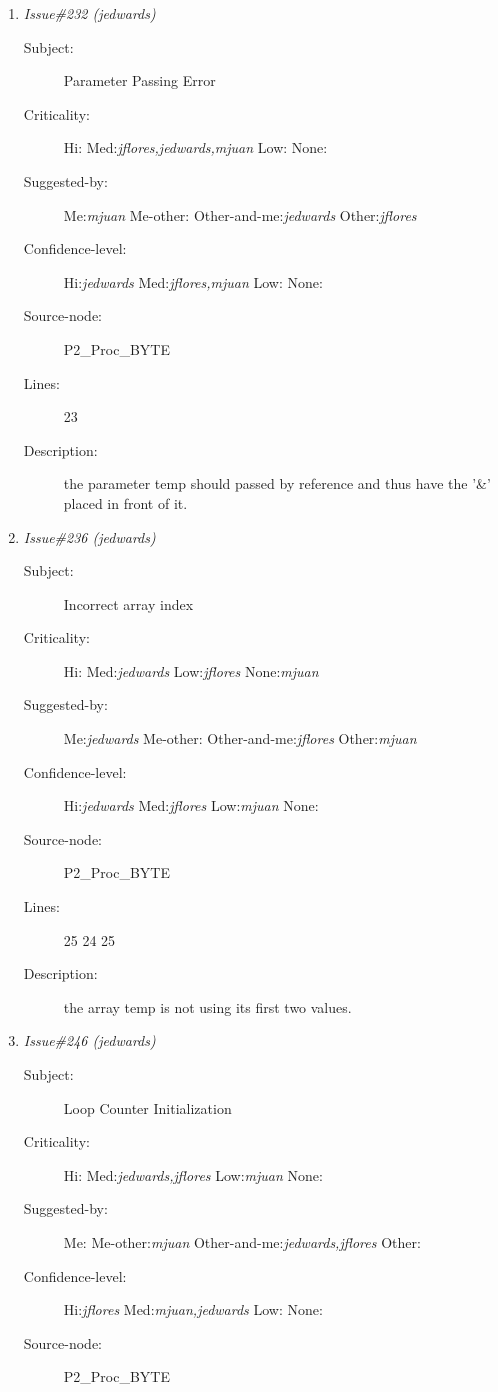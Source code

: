\begin{enumerate}
\begin{description}
\item [Lines:] 18

\item [Description:] Another incorrect loop and variable size
\end{description}
\item {\it Issue\#232 (jedwards)}
\begin{description}
\item [Subject:] Parameter Passing Error
\item [Criticality:] Hi:{\it } Med:{\it jflores,jedwards,mjuan} Low:{\it } None:{\it }
\item [Suggested-by:] Me:{\it mjuan} Me-other:{\it } Other-and-me:{\it jedwards} Other:{\it jflores}
\item [Confidence-level:] Hi:{\it jedwards} Med:{\it jflores,mjuan} Low:{\it } None:{\it }
\item [Source-node:] P2\_Proc\_BYTE

\item [Lines:] 23

\item [Description:] the parameter temp should passed by reference
and thus have the '\&' placed in front of it.
\end{description}
\item {\it Issue\#236 (jedwards)}
\begin{description}
\item [Subject:] Incorrect array index
\item [Criticality:] Hi:{\it } Med:{\it jedwards} Low:{\it jflores} None:{\it mjuan}
\item [Suggested-by:] Me:{\it jedwards} Me-other:{\it } Other-and-me:{\it jflores} Other:{\it mjuan}
\item [Confidence-level:] Hi:{\it jedwards} Med:{\it jflores} Low:{\it mjuan} None:{\it }
\item [Source-node:] P2\_Proc\_BYTE

\item [Lines:] 25 24 25

\item [Description:] the array temp is not using its first two
values.
\end{description}
\item {\it Issue\#246 (jedwards)}
\begin{description}
\item [Subject:] Loop Counter Initialization
\item [Criticality:] Hi:{\it } Med:{\it jedwards,jflores} Low:{\it mjuan} None:{\it }
\item [Suggested-by:] Me:{\it } Me-other:{\it mjuan} Other-and-me:{\it jedwards,jflores} Other:{\it }
\item [Confidence-level:] Hi:{\it jflores} Med:{\it mjuan,jedwards} Low:{\it } None:{\it }
\item [Source-node:] P2\_Proc\_BYTE


\end{description}
\end{enumerate}
